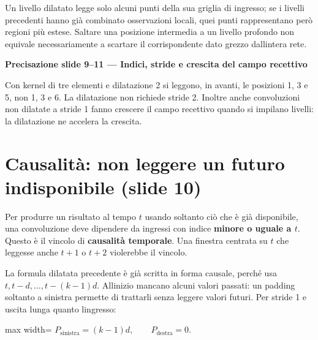\documentclass[11pt,a4paper,oneside,openany]{book}
\renewenvironment{quote}{\list{}{\leftmargin=1em\rightmargin=0pt}\item\relax}{\endlist}
\begin{document}
Un livello dilatato legge solo alcuni punti della sua griglia di ingresso; se i livelli precedenti hanno già combinato osservazioni locali, quei punti rappresentano però regioni più estese. Saltare una posizione intermedia a un livello profondo non equivale necessariamente a scartare il corrispondente dato grezzo dall\textquotesingle intera rete.

\begin{quote}
\textbf{Precisazione slide 9--11 --- Indici, stride e crescita del campo recettivo}
\end{quote}

\begin{quote}
Con kernel di tre elementi e dilatazione 2 si leggono, in avanti, le posizioni 1, 3 e 5, non 1, 3 e 6. La dilatazione non richiede stride 2. Inoltre anche convoluzioni non dilatate a stride 1 fanno crescere il campo recettivo quando si impilano livelli: la dilatazione ne accelera la crescita.
\end{quote}

\section{Causalità: non leggere un futuro indisponibile (slide 10)}\label{f04-r165}

Per produrre un risultato al tempo \(t\) usando soltanto ciò che è già disponibile, una convoluzione deve dipendere da ingressi con indice \textbf{minore o uguale a \(t\)}. Questo è il vincolo di \textbf{causalità temporale}. Una finestra centrata su \(t\) che leggesse anche \(t+1\) o \(t+2\) violerebbe il vincolo.

La formula dilatata precedente è già scritta in forma causale, perché usa \(t,t-d,\ldots,t-(k-1)d\). All\textquotesingle inizio mancano alcuni valori passati: un padding soltanto a sinistra permette di trattarli senza leggere valori futuri. Per stride 1 e uscita lunga quanto l\textquotesingle ingresso:

\begin{center}
\begin{adjustbox}{max width=\linewidth}
$\displaystyle \boxed{P_{\mathrm{sinistra}}=(k-1)d,\qquad P_{\mathrm{destra}}=0.}$
\end{adjustbox}
\end{center}
\end{document}
